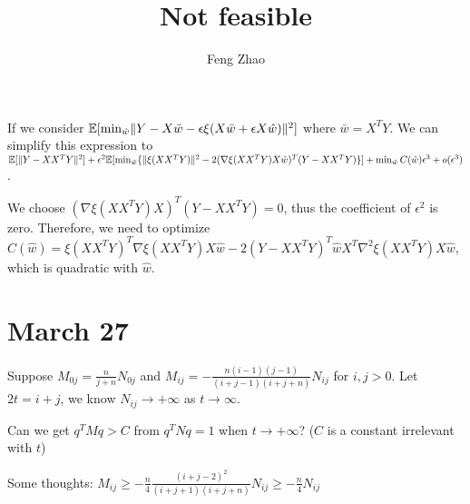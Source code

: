 \documentclass{article}
\title{Not feasible}
\author{Feng Zhao}
\DeclarePairedDelimiter\norm{\lVert}{\rVert}
\def\E{\mathbb{E}}
\begin{document}
\maketitle
If we consider $\E[\min_{\hat{w}}\norm{Y - X \bar{w} - \epsilon
\xi (X \bar{w} + \epsilon X \hat{w})}^2]$ where
$\bar{w} = X^T Y$. We can simplify this expression to
$\E[\norm{Y-XX^TY}^2] + \epsilon^2
\E[\min_{\hat{w}}\{\norm{\xi(XX^TY)}^2 -
2(\nabla \xi(XX^TY) X\hat{w})^T(Y-XX^TY)\}] +
\min_{\hat{w}}C(\hat{w})\epsilon^3 + o(\epsilon^3)$.

We choose $(\nabla \xi(XX^TY) X)^T (Y-XX^TY) = 0$,
thus the coefficient of $\epsilon^2$ is zero.
Therefore, we need to optimize
$C(\hat{w}) = \xi(XX^TY)^T \nabla \xi(XX^TY) X\hat{w} -
2(Y-XX^TY)^T\hat{w}X^T\nabla^2\xi(XX^TY)X\hat{w}$,
which is quadratic with $\hat{w}$.

\section{March 27}
Suppose $M_{0j} = \frac{n}{j+n}N_{0j}$ and
$M_{ij} = -\frac{n(i-1)(j-1)}{(i+j-1)(i+j+n)}
N_{ij}$
for $i,j>0$. Let $2t= i+j$, we know $N_{ij}
\to +\infty$ as $t \to \infty$.

Can we get $q^TMq > C$ from $q^TNq=1$ when $t \to +\infty$?
($C$ is a constant irrelevant with $t$)

Some thoughts: $ M_{ij} \geq
-\frac{n}{4}\frac{(i+j-2)^2}{(i+j+1)(i+j+n)}N_{ij}
\geq -\frac{n}{4}N_{ij}$
\end{document}
